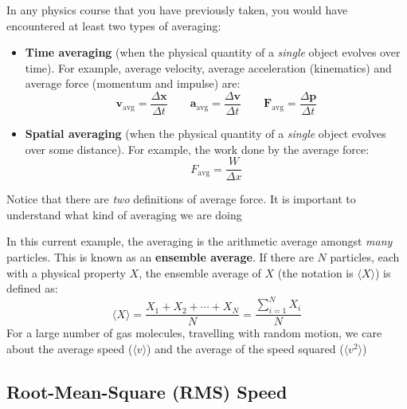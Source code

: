 \begin{remark}
  In any physics course that you have previously taken, you would have
  encountered at least two types of averaging:
  \begin{itemize}
  \item\textbf{Time averaging} (when the physical quantity of a \emph{single}
    object evolves over time). For example, average velocity, average
    acceleration (kinematics) and average force (momentum and impulse) are:
    \begin{equation*}
      \bm v_\text{avg}=\frac{\Delta\bm x}{\Delta t}\quad\quad
      \bm a_\text{avg}=\frac{\Delta\bm v}{\Delta t}\quad\quad
      \bm F_\text{avg}=\frac{\Delta\bm p}{\Delta t}
    \end{equation*}
    
  \item\textbf{Spatial averaging} (when the physical quantity of a
    \emph{single} object evolves over some distance). For example, the work
    done by the average force:
    \begin{equation*}
      F_\text{avg}=\frac W{\Delta x}
    \end{equation*}
  \end{itemize}
  Notice that there are \emph{two} definitions of average force. It is
  important to understand what kind of averaging we are doing

  In this current example, the averaging is the arithmetic average amongst
  \emph{many} particles. This is known as an \textbf{ensemble average}. If
  there are $N$ particles, each with a physical property $X$, the ensemble
  average of $X$ (the notation is $\langle X\rangle$) is defined as:
  \begin{equation}
    \langle X\rangle = \frac{X_1+X_2+\cdots+X_N}N=\frac{\sum_{i=1}^N X_i}N
  \end{equation}
  For a large number of gas molecules, travelling with random motion, we care
  about the average speed ($\langle v\rangle$) and the average of the speed
  squared ($\langle v^2\rangle$)
\end{remark}




\subsection{Root-Mean-Square (RMS) Speed}

